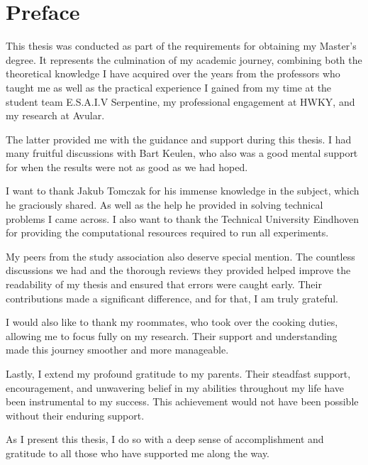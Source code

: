 \chapter*{Preface}\label{chapter:preface}

This thesis was conducted as part of the requirements for obtaining my Master’s degree. It represents the culmination of my academic journey, combining both the theoretical knowledge I have acquired over the years from the professors who taught me as well as the practical experience I gained from my time at the student team E.S.A.I.V Serpentine, my professional engagement at HWKY, and my research at Avular.

The latter provided me with the guidance and support during this thesis. I had many fruitful discussions with Bart Keulen, who also was a good mental support for when the results were not as good as we had hoped.

I want to thank Jakub Tomczak for his immense knowledge in the subject, which he graciously shared. As well as the help he provided in solving technical problems I came across. I also want to thank the Technical University Eindhoven for providing the computational resources required to run all experiments.

My peers from the study association also deserve special mention. The countless discussions we had and the thorough reviews they provided helped improve the readability of my thesis and ensured that errors were caught early. Their contributions made a significant difference, and for that, I am truly grateful.

I would also like to thank my roommates, who took over the cooking duties, allowing me to focus fully on my research. Their support and understanding made this journey smoother and more manageable.

Lastly, I extend my profound gratitude to my parents. Their steadfast support, encouragement, and unwavering belief in my abilities throughout my life have been instrumental to my success. This achievement would not have been possible without their enduring support.

As I present this thesis, I do so with a deep sense of accomplishment and gratitude to all those who have supported me along the way.